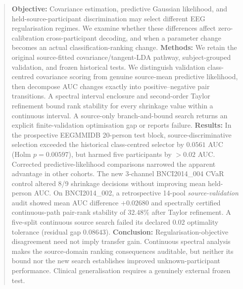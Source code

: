 \begin{abstract}
\textbf{Objective:} Covariance estimation, predictive
Gaussian likelihood, and held-source-participant
discrimination may select different EEG
regularisation regimes. We examine whether
these differences affect zero-calibration
cross-participant decoding, and when a
parameter change becomes an actual
classification-ranking change.
\textbf{Methods:} We retain the original
source-fitted covariance/tangent-LDA pathway,
subject-grouped validation, and frozen
historical tests. We distinguish validation
class-centred covariance scoring from genuine
source-mean predictive likelihood, then
decompose AUC changes exactly into
positive--negative pair transitions. A spectral
interval enclosure and second-order Taylor
refinement bound rank stability for every
shrinkage value within a continuous interval.
A source-only branch-and-bound search returns
an explicit finite-validation optimisation
gap or reports failure.
\textbf{Results:} In the prospective EEGMMIDB
20-person test block, source-discriminative
selection exceeded the historical class-centred
selector by $0.0561$ AUC (Holm $p=0.00597$),
but harmed five participants by $>0.02$ AUC.
Corrected predictive-likelihood comparisons
narrowed the apparent advantage in other
cohorts. The new 3-channel BNCI2014\_004
CVaR control altered 8/9 shrinkage decisions
without improving mean held-person AUC.
On BNCI2014\_002, a retrospective 14-pool
\emph{source-validation} audit showed
mean AUC difference $+0.02680$ and
spectrally certified continuous-path
pair-rank stability of $32.48\%$ after
Taylor refinement. A five-split continuous
source search failed its declared $0.02$
optimality tolerance (residual gap $0.08643$).
\textbf{Conclusion:} Regularisation-objective
disagreement need not imply transfer gain.
Continuous spectral analysis makes the
source-domain ranking consequences auditable,
but neither its bound nor the new search
establishes improved unknown-participant
performance. Clinical generalisation
requires a genuinely external frozen test.
\end{abstract}
